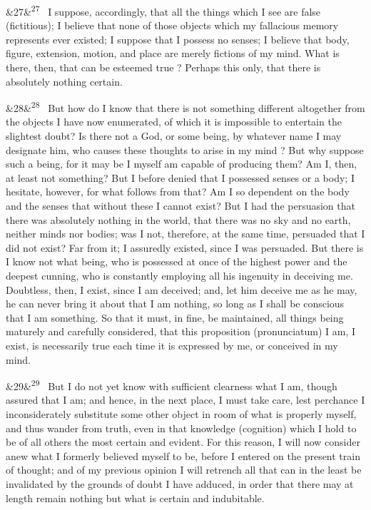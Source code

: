 \documentclass[12pt]{article}
\newcommand{\para}[1][]{\par\noindent\ifx&#1&\else\textsuperscript{\footnotesize #1}~\fi}
\begin{document}
\para[27] I suppose, accordingly, that all the things which I see are false (fictitious); I believe that none of those objects which my fallacious memory represents ever existed; I suppose that I possess no senses; I believe that body, figure, extension, motion, and place are merely fictions of my mind. What is there, then, that can be esteemed true ? Perhaps this only, that there is absolutely nothing certain.

\para[28] But how do I know that there is not something different altogether from the objects I have now enumerated, of which it is impossible to entertain the slightest doubt? Is there not a God, or some being, by whatever name I may designate him, who causes these thoughts to arise in my mind ? But why suppose such a being, for it may be I myself am capable of producing them? Am I, then, at least not something? But I before denied that I possessed senses or a body; I hesitate, however, for what follows from that? Am I so dependent on the body and the senses that without these I cannot exist? But I had the persuasion that there was absolutely nothing in the world, that there was no sky and no earth, neither minds nor bodies; was I not, therefore, at the same time, persuaded that I did not exist? Far from it; I assuredly existed, since I was persuaded. But there is I know not what being, who is possessed at once of the highest power and the deepest cunning, who is constantly employing all his ingenuity in deceiving me. Doubtless, then, I exist, since I am deceived; and, let him deceive me as he may, he can never bring it about that I am nothing, so long as I shall be conscious that I am something. So that it must, in fine, be maintained, all things being maturely and carefully considered, that this proposition (pronunciatum) I am, I exist, is necessarily true each time it is expressed by me, or conceived in my mind.

\para[29] But I do not yet know with sufficient clearness what I am, though assured that I am; and hence, in the next place, I must take care, lest perchance I inconsiderately substitute some other object in room of what is properly myself, and thus wander from truth, even in that knowledge (cognition) which I hold to be of all others the most certain and evident. For this reason, I will now consider anew what I formerly believed myself to be, before I entered on the present train of thought; and of my previous opinion I will retrench all that can in the least be invalidated by the grounds of doubt I have adduced, in order that there may at length remain nothing but what is certain and indubitable.
\end{document}
